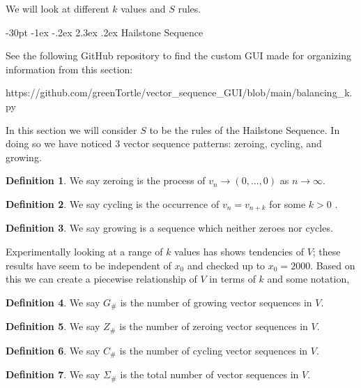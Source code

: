 \documentclass[10pt]{article}
\makeatletter
\renewcommand\section{\@startsection {section}{1}{\z@}
{-30pt \@plus -1ex \@minus -.2ex}
{2.3ex \@plus.2ex}
{\normalfont\normalsize\bfseries\boldmath}}
\theoremstyle{definition}
\newtheorem{definition}{Definition}
\makeatother
\begin{document}
We will look at different $k$ values and $S$ rules.

\section{Hailstone Sequence}

See the following GitHub repository to find the custom GUI made for organizing information from this section: 

https://github.com/greenTortle/vector\_sequence\_GUI/blob/main/balancing\_k.py

In this section we will consider $S$ to be the rules of the Hailstone Sequence. In doing so we have noticed 3 vector sequence patterns: zeroing, cycling, and growing.

\begin{definition}
    We say zeroing is the process of $v_n \xrightarrow{} (0,...,0)$ as $n \xrightarrow{} \infty$.
\end{definition}

\begin{definition}
    We say cycling is the occurrence of $v_n=v_{n+k}$ for some $k>0$ .
\end{definition}

\begin{definition}
    We say growing is a sequence which neither zeroes nor cycles. 
\end{definition}

Experimentally looking at a range of $k$ values has shows tendencies of $V$; these results have seem to be independent of $x_0$ and checked up to $x_0=2000$. Based on this we can create a piecewise relationship of $V$ in terms of $k$ and some notation,

\begin{definition}
    We say $G_\#$ is the number of growing vector sequences in $V$.
\end{definition}

\begin{definition}
    We say $Z_\#$ is the number of zeroing vector sequences in $V$.
\end{definition}

\begin{definition}
    We say $C_\#$ is the number of cycling vector sequences in $V$.
\end{definition}

\begin{definition}
    We say $\Sigma_\#$ is the total number of vector sequences in $V$.
\end{definition}
\end{document}
